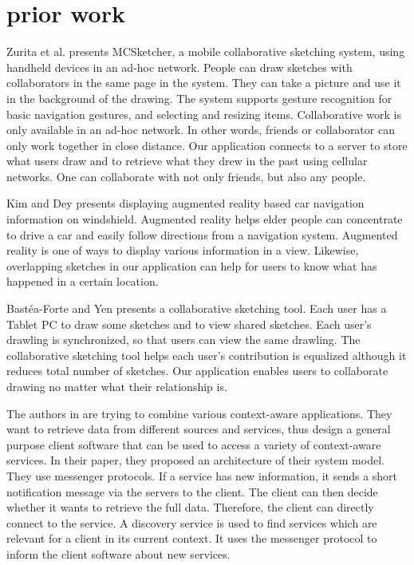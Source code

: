 \documentclass{chi2009}
\begin{document}
\section{prior work}

Zurita et al. \cite{sketching:zurita} presents MCSketcher, a mobile
collaborative sketching system, using handheld devices in an ad-hoc network.
People can draw sketches with collaborators in the same page in the system.
They can take a picture and use it in the background of the drawing. The system
supports gesture recognition for basic navigation gestures, and selecting and
resizing items. Collaborative work is only available in an ad-hoc network. In
other words, friends or collaborator can only work together in close distance.
Our application connects to a server to store what users draw and to retrieve
what they drew in the past using cellular networks. One can collaborate with
not only friends, but also any people.

Kim and Dey \cite{augmented_reality:kim} presents displaying augmented reality
based car navigation information on windshield. Augmented reality helps elder
people can concentrate to drive a car and easily follow directions from a
navigation system. Augmented reality is one of ways to display various
information in a view. Likewise, overlapping sketches in our application can help for users to
know what has happened in a certain location.

Bast\'{e}a-Forte and Yen \cite{brainstorming:marcello} presents a collaborative
sketching tool. Each user has a Tablet PC to draw some sketches and to view
shared sketches. Each user's drawling is synchronized, so that users can view
the same drawling. The collaborative sketching tool helps each user's
contribution is equalized although it reduces total number of sketches. Our
application enables users to collaborate drawing no matter what their
relationship is.

The authors in \cite{context:weis} are trying to combine various context-aware
applications. They want to retrieve data from different sources and services,
thus design a general purpose client software that can be used to access a
variety of context-aware services. In their paper, they proposed an
architecture of their system model. They use messenger protocols. If a service
has new information, it sends a short notification message via the servers to
the client. The client can then decide whether it wants to retrieve the full
data. Therefore, the client can directly connect to the service. A discovery
service is used to find services which are relevant for a client in its current
context. It uses the messenger protocol to inform the client software about new
services.
\end{document}
